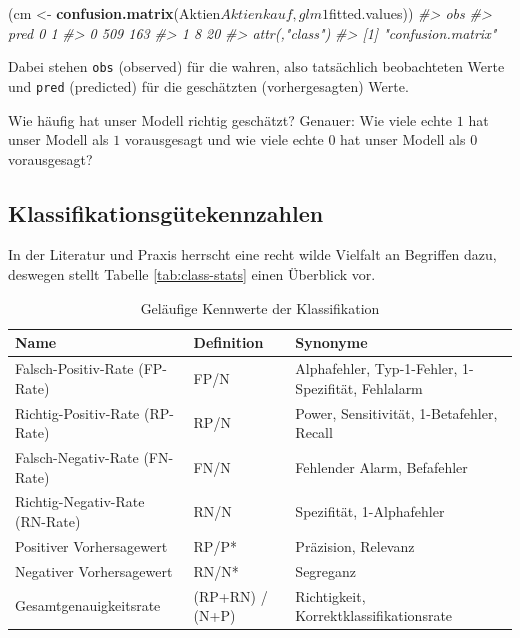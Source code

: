\documentclass[12pt,ngerman,]{book}
\makeatletter
\newenvironment{Shaded}{\begin{snugshade}}{\end{snugshade}}
\newcommand{\KeywordTok}[1]{\textcolor[rgb]{0.13,0.29,0.53}{\textbf{{#1}}}}
\newcommand{\StringTok}[1]{\textcolor[rgb]{0.31,0.60,0.02}{{#1}}}
\newcommand{\CommentTok}[1]{\textcolor[rgb]{0.56,0.35,0.01}{\textit{{#1}}}}
\newcommand{\NormalTok}[1]{{#1}}
\newenvironment{kframe}{%
\medskip{}
\setlength{\fboxsep}{.8em}
 \def\at@end@of@kframe{}%
 \ifinner\ifhmode%
  \def\at@end@of@kframe{\end{minipage}}%
  \begin{minipage}{\columnwidth}%
 \fi\fi%
 \def\FrameCommand##1{\hskip\@totalleftmargin \hskip-\fboxsep
 \colorbox{shadecolor}{##1}\hskip-\fboxsep
     \hskip-\linewidth \hskip-\@totalleftmargin \hskip\columnwidth}%
 \MakeFramed {\advance\hsize-\width
   \@totalleftmargin\z@ \linewidth\hsize
   \@setminipage}}%
 {\par\unskip\endMakeFramed%
 \at@end@of@kframe}
\renewenvironment{Shaded}{\begin{kframe}}{\end{kframe}}
\theoremstyle{definition}
\theoremstyle{definition}
\theoremstyle{remark}
\makeatother
\begin{document}
\begin{Shaded}
\begin{Highlighting}[]
\NormalTok{(cm <-}\StringTok{ }\KeywordTok{confusion.matrix}\NormalTok{(Aktien$Aktienkauf, glm1$fitted.values)) }
\CommentTok{#>     obs}
\CommentTok{#> pred   0   1}
\CommentTok{#>    0 509 163}
\CommentTok{#>    1   8  20}
\CommentTok{#> attr(,"class")}
\CommentTok{#> [1] "confusion.matrix"}
\end{Highlighting}
\end{Shaded}

Dabei stehen \texttt{obs} (observed) für die wahren, also tatsächlich
beobachteten Werte und \texttt{pred} (predicted) für die geschätzten
(vorhergesagten) Werte.

Wie häufig hat unser Modell richtig geschätzt? Genauer: Wie viele echte
\(1\) hat unser Modell als \(1\) vorausgesagt und wie viele echte \(0\)
hat unser Modell als \(0\) vorausgesagt?

\subsection{Klassifikationsgütekennzahlen}\label{klassifikationsgutekennzahlen}

In der Literatur und Praxis herrscht eine recht wilde Vielfalt an
Begriffen dazu, deswegen stellt Tabelle \ref{tab:class-stats} einen
Überblick vor.

\begin{table}

\caption{\label{tab:diag-stats}Geläufige Kennwerte der Klassifikation}
\centering
\begin{tabular}[t]{l|l|l}
\hline
Name & Definition & Synonyme\\
\hline
Falsch-Positiv-Rate (FP-Rate) & FP/N & Alphafehler, Typ-1-Fehler, 1-Spezifität, Fehlalarm\\
\hline
Richtig-Positiv-Rate (RP-Rate) & RP/N & Power, Sensitivität, 1-Betafehler, Recall\\
\hline
Falsch-Negativ-Rate (FN-Rate) & FN/N & Fehlender Alarm, Befafehler\\
\hline
Richtig-Negativ-Rate (RN-Rate) & RN/N & Spezifität, 1-Alphafehler\\
\hline
Positiver Vorhersagewert & RP/P* & Präzision, Relevanz\\
\hline
Negativer Vorhersagewert & RN/N* & Segreganz\\
\hline
Gesamtgenauigkeitsrate & (RP+RN) / (N+P) & Richtigkeit, Korrektklassifikationsrate\\
\hline
\end{tabular}
\end{table}
\end{document}

